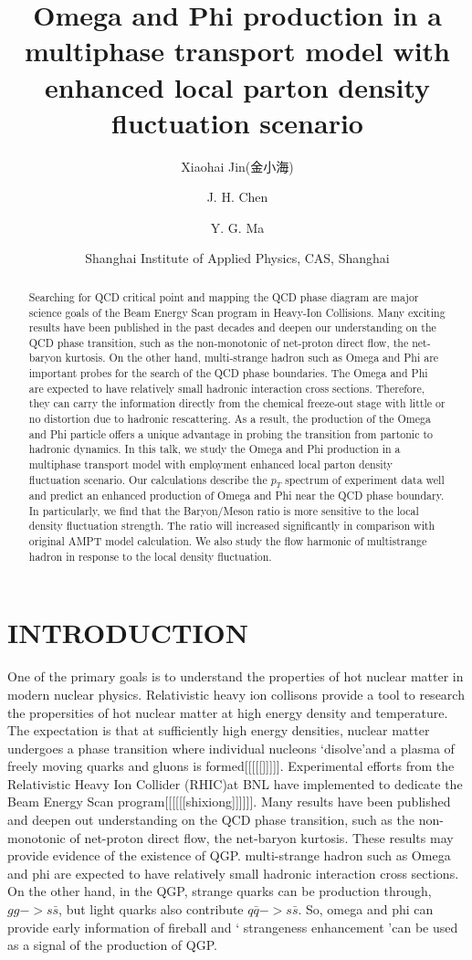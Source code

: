 \documentclass[11pt,a4paper,openany]{article}
\title{\vspace{-20mm}\textbf{\Large Omega and Phi production in a multiphase transport model with enhanced local parton
density fluctuation scenario}}
\author{Xiaohai Jin(金小海) \and J. H. Chen \and Y. G. Ma}
\date{Shanghai Institute of Applied Physics, CAS, Shanghai}
\begin{document}
\maketitle

\begin{abstract}
  Searching for QCD critical point and mapping the QCD phase diagram are major science goals of the Beam Energy Scan program in Heavy-Ion Collisions. Many exciting results have been published in the past decades and deepen our understanding on the QCD phase transition, such as the non-monotonic of net-proton direct flow, the net-baryon kurtosis. On the other hand, multi-strange hadron such as Omega and Phi are important probes for the search of the QCD phase boundaries. The Omega and Phi are expected to have relatively small hadronic interaction cross sections. Therefore, they can carry the information directly from the chemical freeze-out stage with little or no distortion due to hadronic rescattering. As a result, the production of the Omega and Phi particle offers a unique advantage in probing the transition from partonic to hadronic dynamics.  In this talk, we study the Omega and Phi production in a multiphase transport model with employment enhanced local parton density fluctuation scenario. Our calculations describe the $p_T$ spectrum of experiment data well and predict an enhanced production of Omega and Phi near the QCD phase boundary. In particularly, we find that the Baryon/Meson ratio is more sensitive to the local density fluctuation strength. The ratio will increased significantly in comparison with original AMPT model calculation. We also study the flow harmonic of multistrange hadron in response to the local density fluctuation.
\end{abstract}

\section{INTRODUCTION}
One of the primary goals is to understand the properties of hot nuclear matter in modern nuclear physics. Relativistic
heavy ion collisons provide a tool to research the propersities of hot nuclear matter at high energy density and temperature.
The expectation is that at sufficiently high energy densities, nuclear matter undergoes a phase transition where individual
nucleons \textquoteleft disolve\textquoteright and a plasma of freely moving quarks and gluons is formed[[[[[]]]]].
Experimental efforts from the Relativistic Heavy Ion Collider (RHIC)at BNL have implemented to dedicate the Beam Energy
Scan program[[[[[[shixiong]]]]]]. Many results have been published and deepen out understanding on the QCD phase
transition, such as the non-monotonic of net-proton direct flow, the net-baryon kurtosis. These results may provide
evidence of the existence of QGP. multi-strange hadron such as Omega and phi are expected to have relatively small
hadronic interaction cross sections. On the other hand, in the QGP, strange quarks can be production through, $gg -> s\bar{s}$, but light quarks
also contribute $q\bar{q} -> s\bar{s}$. So, omega and phi can provide early information of fireball and \textquoteleft
strangeness enhancement \textquoteright can be used as a signal of the production of QGP.
\end{document}
